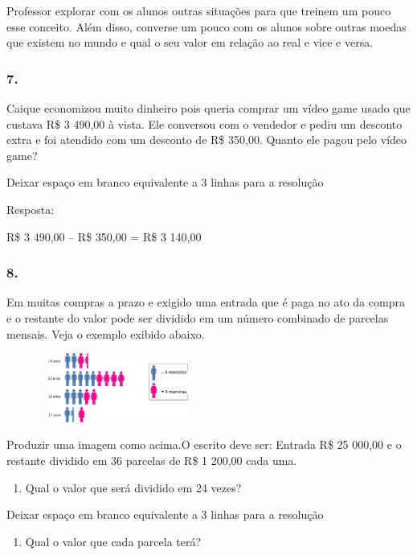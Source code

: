 Professor explorar com os alunos outras situações para que treinem um
pouco esse conceito. Além disso, converse um pouco com os alunos sobre
outras moedas que existem no mundo e qual o seu valor em relação ao real
e vice e versa.

\subsubsection{7.}\label{section-86}

Caique economizou muito dinheiro pois queria comprar um vídeo game usado
que custava R\$ 3 490,00 à vista. Ele conversou com o vendedor e pediu
um desconto extra e foi atendido com um desconto de R\$ 350,00. Quanto
ele pagou pelo vídeo game?

Deixar espaço em branco equivalente a 3 linhas para a resolução

Resposta:

R\$ 3 490,00 -- R\$ 350,00 = R\$ 3 140,00

\subsubsection{8.}\label{section-87}

Em muitas compras a prazo e exigido uma entrada que é paga no ato da
compra e o restante do valor pode ser dividido em um número combinado de
parcelas mensais. Veja o exemplo exibido abaixo.

\includegraphics[width=2.90025in,height=0.89174in]{media/image76.png}

Produzir uma imagem como acima.O escrito deve ser: Entrada R\$ 25 000,00
e o restante dividido em 36 parcelas de R\$ 1 200,00 cada uma.

\begin{enumerate}
\def\labelenumi{\alph{enumi})}
\item
  Qual o valor que será dividido em 24 vezes?
\end{enumerate}

Deixar espaço em branco equivalente a 3 linhas para a resolução

\begin{enumerate}
\def\labelenumi{\alph{enumi})}
\item
  Qual o valor que cada parcela terá?
\end{enumerate}

